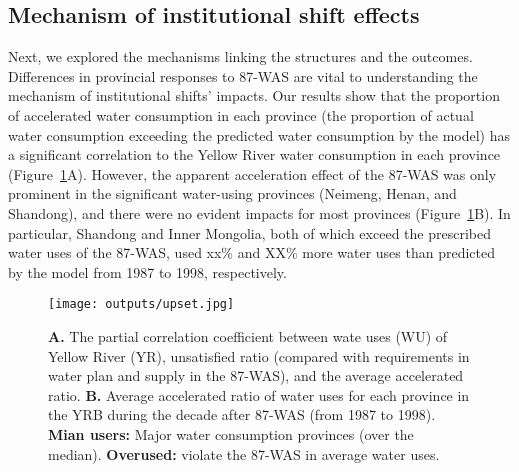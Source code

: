 
\subsection{Mechanism of institutional shift effects}
\label{reason}
Next, we explored the mechanisms linking the structures and the outcomes.
Differences in provincial responses to 87-WAS are vital to understanding the mechanism of institutional shifts' impacts.
Our results show that the proportion of accelerated water consumption in each province (the proportion of actual water consumption exceeding the predicted water consumption by the model) has a significant correlation to the Yellow River water consumption in each province (Figure~\ref{fig:upset}A).
However, the apparent acceleration effect of the 87-WAS was only prominent in the significant water-using provinces (Neimeng, Henan, and Shandong), and there were no evident impacts for most provinces (Figure~\ref{fig:upset}B).
In particular, Shandong and Inner Mongolia, both of which exceed the prescribed water uses of the 87-WAS, used xx\% and XX\% more water uses than predicted by the model from 1987 to 1998, respectively.

\begin{figure}[!h]
    \centering
    \texttt{[image: outputs/upset.jpg]}
    \caption{
        \textbf{A.} The partial correlation coefficient between wate uses (WU) of Yellow River (YR), unsatisfied ratio (compared with requirements in water plan and supply in the 87-WAS), and the average accelerated ratio.
        \textbf{B.} Average accelerated ratio of water uses for each province in the YRB during the decade after 87-WAS (from 1987 to 1998).
        \textbf{Mian users:} Major water consumption provinces (over the median).
        \textbf{Overused:} violate the 87-WAS in average water uses.
    }
    \label{fig:upset}
\end{figure}

